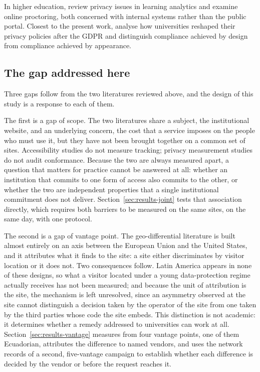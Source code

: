 \documentclass[]{interact}
\begin{document}
In higher education, \citet{liu2023understanding} review privacy issues in learning analytics and \citet{mutimukwe2026privacy} examine online proctoring, both concerned with internal systems rather than the public portal. Closest to the present work, \citet{munot2025compliance} analyse how universities reshaped their privacy policies after the GDPR and distinguish compliance achieved by design from compliance achieved by appearance.

\subsection{The gap addressed here}\label{sec:related-gap}

Three gaps follow from the two literatures reviewed above, and the design of this study is a response to each of them.

The first is a gap of scope. The two literatures share a subject, the institutional website, and an underlying concern, the cost that a service imposes on the people who must use it, but they have not been brought together on a common set of sites. Accessibility studies do not measure tracking; privacy measurement studies do not audit conformance. Because the two are always measured apart, a question that matters for practice cannot be answered at all: whether an institution that commits to one form of access also commits to the other, or whether the two are independent properties that a single institutional commitment does not deliver. Section~\ref{sec:results-joint} tests that association directly, which requires both barriers to be measured on the same sites, on the same day, with one protocol.

The second is a gap of vantage point. The geo-differential literature is built almost entirely on an axis between the European Union and the United States, and it attributes what it finds to the site: a site either discriminates by visitor location or it does not. Two consequences follow. Latin America appears in none of these designs, so what a visitor located under a young data-protection regime actually receives has not been measured; and because the unit of attribution is the site, the mechanism is left unresolved, since an asymmetry observed at the site cannot distinguish a decision taken by the operator of the site from one taken by the third parties whose code the site embeds. This distinction is not academic: it determines whether a remedy addressed to universities can work at all. Section~\ref{sec:results-vantage} measures from four vantage points, one of them Ecuadorian, attributes the difference to named vendors, and uses the network records of a second, five-vantage campaign to establish whether each difference is decided by the vendor or before the request reaches it.
\end{document}

